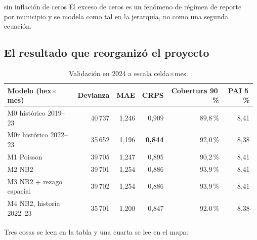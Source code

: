\documentclass[11pt,a4paper]{article}
\begin{document}
\begin{decision}{sin inflación de ceros}
El exceso de ceros es un fenómeno de régimen de reporte por municipio y se
modela como tal en la jerarquía, no como una segunda ecuación.
\end{decision}

\subsection{El resultado que reorganizó el proyecto}\label{sec:municipal}

\begin{table}[H]
\centering\small
\begin{tabular}{lrrrrr}
\toprule
Modelo (hex$\times$mes) & Devianza & MAE & CRPS & Cobertura 90\,\% & PAI 5\,\% \\
\midrule
M0 histórico 2019--23   & 40\,737 & 1,246 & 0,909 & 89,8\,\% & 8,41 \\
M0r histórico 2022--23  & 35\,652 & 1,196 & \textbf{0,844} & 92,0\,\% & 8,38 \\
M1 Poisson              & 39\,705 & 1,247 & 0,895 & 90,2\,\% & 8,41 \\
M2 NB2                  & 39\,701 & 1,254 & 0,886 & 93,9\,\% & 8,41 \\
M3 NB2 + rezago espacial & 39\,702 & 1,254 & 0,886 & 93,9\,\% & 8,41 \\
M4 NB2, historia 2022--23 & 35\,701 & 1,200 & 0,847 & 92,0\,\% & 8,38 \\
\bottomrule
\end{tabular}
\caption{Validación en 2024 a escala celda$\times$mes.}
\end{table}

Tres cosas se leen en la tabla y una cuarta se lee en el mapa:
\end{document}
